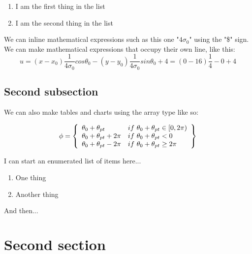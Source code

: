 \documentclass[a4paper,12pt]{article} %
\begin{document}
\vspace{2mm}
\begin{enumerate}
\item I am the first thing in the list
\item I am the second thing in the list
\end{enumerate}
\vspace{2mm}

\noindent
We can inline mathematical expressions such as this one "$4 \sigma_0$" using the "\$" sign. We can make mathematical expressions that occupy their own line, like this: 
\vspace{2mm}
$$u = (x - x_0) \frac{1}{4 \sigma_0} cos \theta_0 - (y - y_0) \frac{1}{4 \sigma_0} sin \theta_0 + 4 = (0 - 16) \frac{1}{4} - 0 + 4$$
\vspace{2mm}

\subsection{Second subsection}

We can also make tables and charts using the array type like so:

\vspace{2mm}
\[ \phi = \left\{ 
\begin{array}{l l}
\theta_0 + \theta_{pt} & if \ \theta_0 + \theta_{pt} \in [0,2 \pi)\\ 
\theta_0 + \theta_{pt} + 2 \pi & if \ \theta_0 + \theta_{pt} < 0\\
\theta_0 + \theta_{pt} - 2 \pi & if \ \theta_0 + \theta_{pt} \ge 2 \pi\\
\end{array} \right\}
\] 
\vspace{2mm}

\noindent
I can start an enumerated list of items here...

\vspace{5mm}
\begin{enumerate}
\item One thing
\item Another thing
\end{enumerate}
\vspace{5mm}

\noindent
And then...

\section{Second section}
\end{document}
